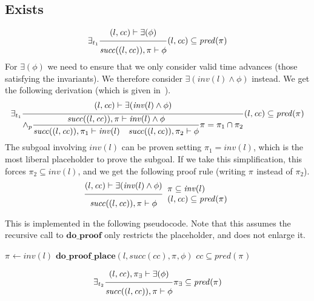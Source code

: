 \documentclass{article}
\newcommand{\proofrule}[3][]{#1 \frac{\raisebox{.7ex}{\normalsize{$#2$}}}
  {\raisebox{-1.0ex}{\normalsize{$#3$}}}}
\newcommand{\placeholder}[1][]{\pi_{#1}}
\newcommand{\loc}{l}
\newcommand{\region}{\mathit{cc}}
\newcommand{\suc}{\mathit{succ}}
\newcommand{\pre}{\mathit{pred}}
\newcommand{\inv}{\mathit{inv}}
\newcommand{\method}[1]{\ensuremath{\mathbf{#1}}}
\begin{document}
\subsection{Exists}

\[
\proofrule[\exists_{t_1}]
{(\loc, \region) \vdash \exists(\phi)}
{\suc((\loc, \region)), \placeholder \vdash \phi}
(\loc, \region) \subseteq \pre(\placeholder)
\]
%
For $\exists(\phi)$ we need to ensure that we only consider valid time advances (those satisfying the invariants).
We therefore consider $\exists(\inv(\loc) \land \phi)$ instead.
We get the following derivation (which is given in~\cite[Appendix C.2]{FC:14}).
\[
\proofrule[\exists_{t_1}]
{(\loc, \region) \vdash \exists(\inv(\loc) \land \phi)}
{
  \proofrule[\land_p]
  {\suc((\loc, \region)), \placeholder \vdash \inv(\loc) \land \phi}
  {\suc((\loc, \region)), \placeholder[1] \vdash \inv(\loc)
  \quad \suc((\loc, \region)), \placeholder[2] \vdash \phi}
  \placeholder = \placeholder[1] \cap \placeholder[2]
}
(\loc, \region) \subseteq \pre(\placeholder)
\]
The subgoal involving $\inv(\loc)$ can be proven setting $\placeholder[1] = \inv(\loc)$, which is
the most liberal placeholder to prove the subgoal. If we take this simplification, this forces $\placeholder[2] \subseteq \inv(\loc)$,
and we get the following proof rule (writing $\placeholder$ instead of $\placeholder[2]$).
\[
\proofrule
{(\loc, \region) \vdash \exists(\inv(\loc) \land \phi)}
{\suc((\loc, \region)), \placeholder \vdash \phi}
\begin{array}{l}
\placeholder \subseteq \inv(\loc) \\
(\loc, \region) \subseteq \pre(\placeholder)
\end{array}
\]

This is implemented in the following pseudocode. Note that this assumes the recursive
call to \method{do\_proof} only restricts the placeholder, and does not enlarge it.

\begin{algorithm}[H]
\caption{$\method{do\_proof\_exists}(\loc, \region, \exists(\phi))$}
\begin{algorithmic}
\STATE $\placeholder \gets \inv(\loc)$ 
\STATE $\method{do\_proof\_place}(\loc, \suc(\region), \placeholder, \phi)$
\RETURN $\region \subseteq \pre(\placeholder)$
\end{algorithmic}
\end{algorithm}

\[
%
\proofrule[\exists_{t_2}]
{(\loc, \region), \placeholder[\exists] \vdash \exists(\phi)}
{\suc((\loc, \region)), \placeholder \vdash \phi}
\placeholder[\exists] \subseteq \pre(\placeholder)
\]
\end{document}
